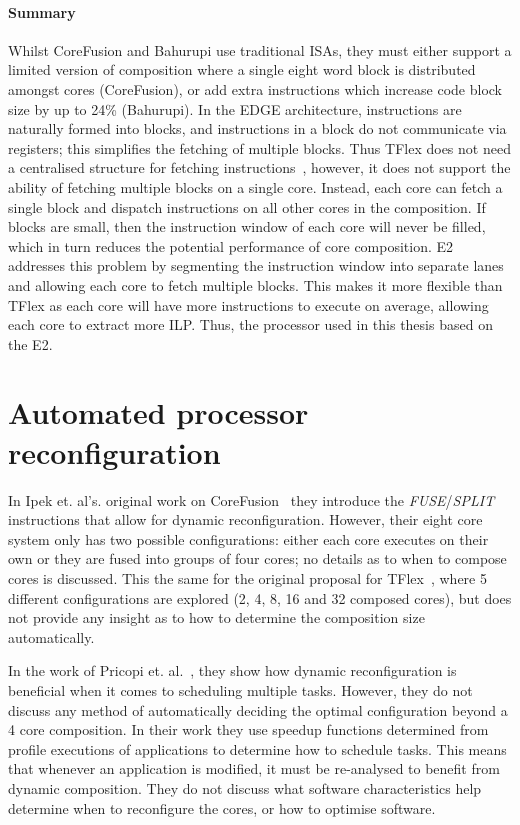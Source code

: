 \paragraph*{Summary}
Whilst CoreFusion and Bahurupi use traditional ISAs, they must either support a limited version of composition where a single eight word block is distributed amongst cores (CoreFusion), or add extra instructions which increase code block size by up to 24\% (Bahurupi).
In the EDGE architecture, instructions are naturally formed into blocks, and instructions in a block do not communicate via registers; this simplifies the fetching of multiple blocks.
Thus TFlex does not need a centralised structure for fetching instructions~\cite{kim2007tflex}, however, it does not support the ability of fetching multiple blocks on a single core.
Instead, each core can fetch a single block and dispatch instructions on all other cores in the composition.
If blocks are small, then the instruction window of each core will never be filled, which in turn reduces the potential performance of core composition.
E2 addresses this problem by segmenting the instruction window into separate lanes and allowing each core to fetch multiple blocks.
This makes it more flexible than TFlex as each core will have more instructions to execute on average, allowing each core to extract more ILP.
Thus, the processor used in this thesis based on the E2.

\section{Automated processor reconfiguration}

In Ipek et. al's. original work on CoreFusion~\cite{ipek2007CoreFusion} they introduce the \textit{FUSE}/\textit{SPLIT} instructions that allow for dynamic reconfiguration.
However, their eight core system only has two possible configurations: either each core executes on their own or they are fused into groups of four cores; no details as to when to compose cores is discussed.
This the same for the original proposal for TFlex~\cite{kim2007tflex}, where 5 different configurations are explored (2, 4, 8, 16 and 32 composed cores), but does not provide any insight as to how to determine the composition size automatically.

In the work of Pricopi et. al.~\cite{pricopiSchedCoreComp2014}, they show how dynamic reconfiguration is beneficial when it comes to scheduling multiple tasks.
However, they do not discuss any method of automatically deciding the optimal configuration beyond a 4 core composition.
In their work they use speedup functions determined from profile executions of applications to determine how to schedule tasks.
This means that whenever an application is modified, it must be re-analysed to benefit from dynamic composition.
They do not discuss what software characteristics help determine when to reconfigure the cores, or how to optimise software.

